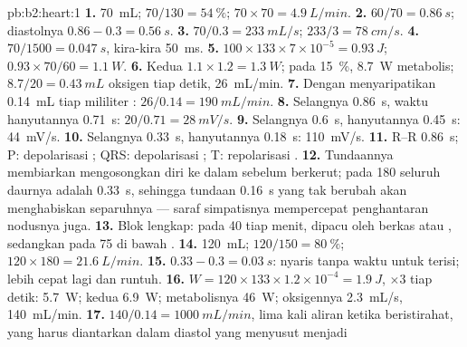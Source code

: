 \begin{solution}{pb:b2:heart:1}
\textbf{1.} \qty{70}{mL}; $70/130 = \qty{54}{\%}$; $70\times 70 =
\qty{4.9}{L/min}$.
\textbf{2.} $60/70 = \qty{0.86}{s}$; diastolnya $0.86 - 0.3 =
\qty{0.56}{s}$.
\textbf{3.} $70/0.3 = \qty{233}{mL/s}$; $233/3 = \qty{78}{cm/s}$.
\textbf{4.} $70/1500 = \qty{0.047}{s}$, kira-kira \qty{50}{ms}.
\textbf{5.} $100\times 133\times 7\times 10^{-5} = \qty{0.93}{J}$;
$0.93\times 70/60 = \qty{1.1}{W}$.
\textbf{6.} Kedua  $1.1\times 1.2 = \qty{1.3}{W}$; pada
\qty{15}{\%}, \qty{8.7}{W} metabolis; $8.7/20 = \qty{0.43}{mL}$
oksigen tiap detik, \qty{26}{mL/min}.
\textbf{7.} Dengan menyaripatikan \qty{0.14}{mL} tiap mililiter :
$26/0.14 = \qty{190}{mL/min}$.
\textbf{8.} Selangnya \qty{0.86}{s}, waktu hanyutannya \qty{0.71}{s}:
$20/0.71 = \qty{28}{mV/s}$.
\textbf{9.} Selangnya \qty{0.6}{s}, hanyutannya \qty{0.45}{s}: \qty{44}{mV/s}.
\textbf{10.} Selangnya \qty{0.33}{s}, hanyutannya \qty{0.18}{s}: \qty{110}{mV/s}.
\textbf{11.} R--R \qty{0.86}{s}; P: depolarisasi ; QRS:
depolarisasi ; T: repolarisasi .
\textbf{12.} Tundaannya membiarkan  mengosongkan diri ke
dalam  sebelum  berkerut; pada 180 seluruh daurnya
adalah \qty{0.33}{s}, sehingga tundaan \qty{0.16}{s} yang tak berubah
akan menghabiskan separuhnya --- saraf simpatisnya mempercepat
penghantaran nodusnya juga.
\textbf{13.} Blok  lengkap:  pada 40 tiap menit, dipacu
oleh berkas atau , sedangkan  pada 75 di
bawah .
\textbf{14.} \qty{120}{mL}; $120/150 = \qty{80}{\%}$; $120\times 180 =
\qty{21.6}{L/min}$.
\textbf{15.} $0.33 - 0.3 = \qty{0.03}{s}$: nyaris tanpa waktu untuk
terisi; lebih cepat lagi dan  runtuh.
\textbf{16.} $W = 120\times 133\times 1.2\times 10^{-4} = \qty{1.9}{J}$,
$\times 3$ tiap detik: \qty{5.7}{W}; kedua  \qty{6.9}{W};
metabolisnya \qty{46}{W}; oksigennya \qty{2.3}{mL/s}, \qty{140}{mL/min}.
\textbf{17.} $140/0.14 = \qty{1000}{mL/min}$, lima kali aliran ketika
beristirahat, yang harus diantarkan dalam diastol yang menyusut menjadi

\end{solution}
